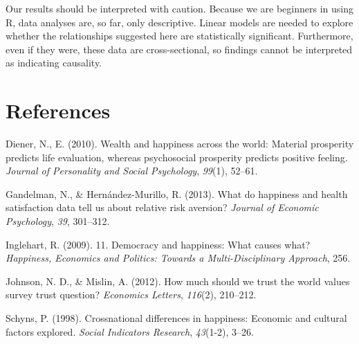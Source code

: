 \documentclass[man, fleqn, noextraspace,floatsintext]{apa6}
\begin{document}
Our results should be interpreted with caution. Because we are beginners in using R, data analyses are, so far, only descriptive. Linear models are needed to explore whether the relationships suggested here are statistically significant. Furthermore, even if they were, these data are cross-sectional, so findings cannot be interpreted as indicating causality.

\newpage

\hypertarget{references}{%
\section{References}\label{references}}

\begingroup
\setlength{\parindent}{-0.5in}
\setlength{\leftskip}{0.5in}

\hypertarget{refs}{}
\leavevmode\hypertarget{ref-diener2010}{}%
Diener, N., E. (2010). Wealth and happiness across the world: Material prosperity predicts life evaluation, whereas psychosocial prosperity predicts positive feeling. \emph{Journal of Personality and Social Psychology}, \emph{99}(1), 52--61.

\leavevmode\hypertarget{ref-gandelman2013happiness}{}%
Gandelman, N., \& Hernández-Murillo, R. (2013). What do happiness and health satisfaction data tell us about relative risk aversion? \emph{Journal of Economic Psychology}, \emph{39}, 301--312.

\leavevmode\hypertarget{ref-inglehart200911}{}%
Inglehart, R. (2009). 11. Democracy and happiness: What causes what? \emph{Happiness, Economics and Politics: Towards a Multi-Disciplinary Approach}, 256.

\leavevmode\hypertarget{ref-johnson2012much}{}%
Johnson, N. D., \& Mislin, A. (2012). How much should we trust the world values survey trust question? \emph{Economics Letters}, \emph{116}(2), 210--212.

\leavevmode\hypertarget{ref-schyns1998crossnational}{}%
Schyns, P. (1998). Crossnational differences in happiness: Economic and cultural factors explored. \emph{Social Indicators Research}, \emph{43}(1-2), 3--26.

\endgroup
\end{document}

